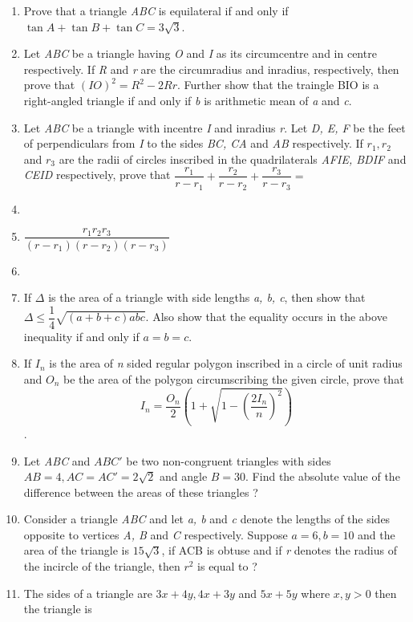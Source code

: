 \documentclass[journal,12pt,twocolumn]{IEEEtran}
\begin{document}
\begin{enumerate}
 \item Prove that a triangle \textsl{ABC} is equilateral if and only if $\tan A+\tan B+\tan C = 3\sqrt{3}$.
 \item Let \textsl{ABC} be a triangle having \textsl{O} and \textsl{I} as its circumcentre and in centre respectively. If \textsl{R} and \textsl{r} are the circumradius and inradius, respectively, then prove that $\left(IO\right)^2 = R^2-2Rr$. Further show that the traingle BIO is a right-angled triangle if and only if \textsl{b} is arithmetic mean of \textsl{a} and \textsl{c}.
 \item Let \textsl{ABC} be a triangle with incentre \textsl{I} and inradius \textsl{r}. Let \textsl{D, E, F} be the feet of perpendiculars from \textsl{I} to the sides \textsl{BC, CA} and \textsl{AB} respectively. If $r_1, r_2$ and $r_3$ are the radii of circles inscribed in the quadrilaterals \textsl{AFIE, BDIF} and \textsl{CEID} respectively, prove that
 $\dfrac{r_1}{r-r_1}+\dfrac{r_2}{r-r_2}+\dfrac{r_3}{r-r_3}=$\item[~] \item[~]$\dfrac{r_1r_2r_3}{\left(r-r_1\right)\left(r-r_2\right)\left(r-r_3\right)}$ \item[~]
 \item If $\Delta$ is the area of a triangle with side lengths \textsl{a, b, c}, then show that $\Delta\leq\dfrac{1}{4}\sqrt{\left(a+b+c\right)abc}$. Also show that the equality occurs in the above inequality if and only if $a=b=c$.
 \item If \textsl{$I_n$} is the area of \textsl{n} sided regular polygon inscribed in a circle of unit radius and \textsl{$O_n$} be the area of the polygon circumscribing the given circle, prove that
 $$I_n = \dfrac{O_n}{2}\left(1+\sqrt{1-\left(\dfrac{2I_n}{n}\right)^2}\right)$$.
 \item Let \textsl{ABC} and \textsl{$ABC '$} be two non-congruent triangles with sides $AB = 4, AC = AC' = 2\sqrt{2}$ and angle $B = 30$\degree. Find the absolute value of the difference between the areas of these triangles ? 
 \item Consider a triangle \textsl{ABC} and let \textsl{a, b} and \textsl{c} denote the lengths of the sides opposite to vertices \textsl{A, B} and \textsl{C} respectively. Suppose $a = 6, b = 10$ and the area of the triangle is $15\sqrt{3}$, if \angle ACB is obtuse and if \textsl{r} denotes the radius of the incircle of the triangle, then $r^2$ is equal to ?
 \item The sides of a triangle are $3x+4y, 4x+3y$ and $5x+5y$ where $x, y>0$ then the triangle is

\end{enumerate}
\end{document}
